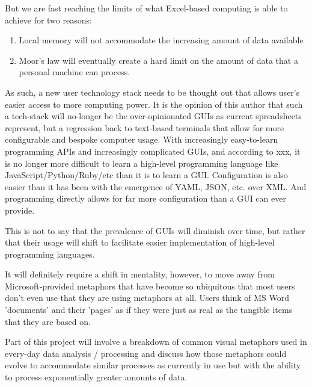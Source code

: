 But we are fast reaching the limits of what Excel-based computing is able to achieve for two reasons:

\begin{enumerate}
    \item Local memory will not accommodate the increasing amount of data available
    \item Moor's law will eventually create a hard limit on the amount of data that a personal machine can process.
\end{enumerate}

As such, a new user technology stack needs to be thought out that allows user's easier access to more computing power. It is the opinion of this author that such a tech-stack will no-longer be the over-opinionated GUIs as current spreadsheets represent, but a regression back to text-based terminals that allow for more configurable and bespoke computer usage. With increasingly easy-to-learn programming APIs and increasingly complicated GUIs, and according to xxx, it is no longer more difficult to learn a high-level programming language like JavaScript/Python/Ruby/etc than it is to learn a GUI. Configuration is also easier than it has been with the emergence of YAML, JSON, etc. over XML. And programming directly allows for far more configuration than a GUI can ever provide.

This is not to say that the prevalence of GUIs will diminish over time, but rather that their usage will shift to facilitate easier implementation of high-level programming languages.

It will definitely require a shift in mentality, however, to move away from Microsoft-provided metaphors that have become so ubiquitous that most users don't even use that they are using metaphors at all. Users think of MS Word 'documents' and their 'pages' as if they were just as real as the tangible items that they are based on.

Part of this project will involve a breakdown of common visual metaphors used in every-day data analysis / processing and discuss how those metaphors could evolve to accommodate similar processes as currently in use but with the ability to process exponentially greater amounts of data.